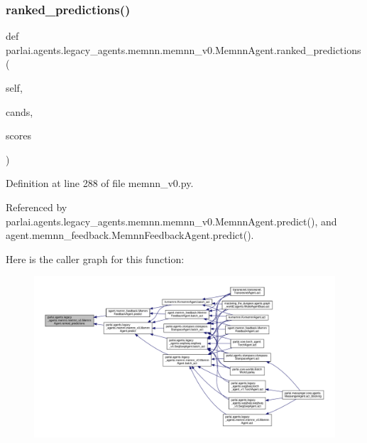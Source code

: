 \subsubsection{\texorpdfstring{ranked\+\_\+predictions()}{ranked\_predictions()}}
{\footnotesize\ttfamily def parlai.\+agents.\+legacy\+\_\+agents.\+memnn.\+memnn\+\_\+v0.\+Memnn\+Agent.\+ranked\+\_\+predictions (\begin{DoxyParamCaption}\item[{}]{self,  }\item[{}]{cands,  }\item[{}]{scores }\end{DoxyParamCaption})}



Definition at line 288 of file memnn\+\_\+v0.\+py.



Referenced by parlai.\+agents.\+legacy\+\_\+agents.\+memnn.\+memnn\+\_\+v0.\+Memnn\+Agent.\+predict(), and agent.\+memnn\+\_\+feedback.\+Memnn\+Feedback\+Agent.\+predict().

Here is the caller graph for this function\+:
\nopagebreak
\begin{figure}[H]
\begin{center}
\leavevmode
\includegraphics[width=350pt]{classparlai_1_1agents_1_1legacy__agents_1_1memnn_1_1memnn__v0_1_1MemnnAgent_aeca21a7823ef27e0f56ac7e420e2beca_icgraph}
\end{center}
\end{figure}
\mbox{\label{classparlai_1_1agents_1_1legacy__agents_1_1memnn_1_1memnn__v0_1_1MemnnAgent_ad365b2e33983158fbf7581d361a74246}} 
